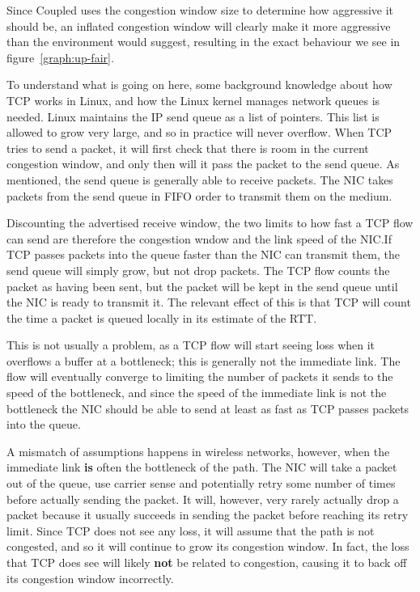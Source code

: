 Since Coupled uses the congestion window size to determine how aggressive it
should be, an inflated congestion window will clearly make it more aggressive
than the environment would suggest, resulting in the exact behaviour we see in
figure~\ref{graph:up-fair}.

To understand what is going on here, some background knowledge about how TCP
works in Linux, and how the Linux kernel manages network queues is needed. Linux
maintains the IP send queue as a list of pointers. This list is allowed to grow
very large, and so in practice will never overflow. When TCP tries to send a
packet, it will first check that there is room in the current congestion window,
and only then will it pass the packet to the send queue. As mentioned, the send
queue is generally able to receive packets. The NIC takes packets from the send
queue in FIFO order to transmit them on the medium.

Discounting the advertised receive window, the two limits to how fast a TCP flow
can send are therefore the congestion wndow and the link speed of the NIC.\@ If
TCP passes packets into the queue faster than the NIC can transmit them, the
send queue will simply grow, but not drop packets. The TCP flow counts the
packet as having been sent, but the packet will be kept in the send queue until
the NIC is ready to transmit it. The relevant effect of this is that TCP will
count the time a packet is queued locally in its estimate of the RTT.

This is not usually a problem, as a TCP flow will start seeing loss when it
overflows a buffer at a bottleneck; this is generally not the immediate link.
The flow will eventually converge to limiting the number of packets it sends to
the speed of the bottleneck, and since the speed of the immediate link is not
the bottleneck the NIC should be able to send at least as fast as TCP passes
packets into the queue.

A mismatch of assumptions happens in wireless networks, however, when the
immediate link \textbf{is} often the bottleneck of the path. The NIC will take a
packet out of the queue, use carrier sense and potentially retry some number of
times before actually sending the packet. It will, however, very rarely actually
drop a packet because it usually succeeds in sending the packet before reaching
its retry limit. Since TCP does not see any loss, it will assume that the path
is not congested, and so it will continue to grow its congestion window.  In
fact, the loss that TCP does see will likely \textbf{not} be related to
congestion, causing it to back off its congestion window incorrectly. %

